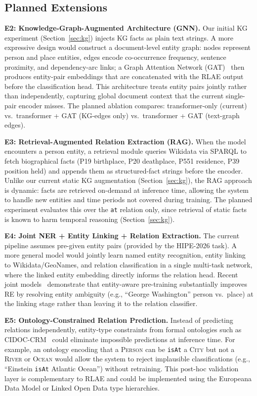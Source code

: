 \documentclass[11pt,a4paper]{article}
\begin{document}
\subsection*{Planned Extensions}

\textbf{E2: Knowledge-Graph-Augmented Architecture (GNN).} Our initial KG experiment (Section~\ref{sec:kg}) injects KG facts as plain text strings. A more expressive design would construct a document-level entity graph: nodes represent person and place entities, edges encode co-occurrence frequency, sentence proximity, and dependency-arc links; a Graph Attention Network (GAT)~\cite{velickovic2018} then produces entity-pair embeddings that are concatenated with the RLAE output before the classification head. This architecture treats entity pairs jointly rather than independently, capturing global document context that the current single-pair encoder misses. The planned ablation compares: transformer-only (current) vs.\ transformer + GAT (KG-edges only) vs.\ transformer + GAT (text-graph edges).

\textbf{E3: Retrieval-Augmented Relation Extraction (RAG).} When the model encounters a person entity, a retrieval module queries Wikidata via SPARQL to fetch biographical facts (P19 birthplace, P20 deathplace, P551 residence, P39 position held) and appends them as structured-fact strings before the encoder. Unlike our current static KG augmentation (Section~\ref{sec:kg}), the RAG approach is dynamic: facts are retrieved on-demand at inference time, allowing the system to handle new entities and time periods not covered during training. The planned experiment evaluates this over the \texttt{at} relation only, since retrieval of static facts is known to harm temporal reasoning (Section~\ref{sec:kg}).

\textbf{E4: Joint NER + Entity Linking + Relation Extraction.} The current pipeline assumes pre-given entity pairs (provided by the HIPE-2026 task). A more general model would jointly learn named entity recognition, entity linking to Wikidata/GeoNames, and relation classification in a single multi-task network, where the linked entity embedding directly informs the relation head. Recent joint models~\cite{yamada2020} demonstrate that entity-aware pre-training substantially improves RE by resolving entity ambiguity (e.g., ``George Washington'' person vs.\ place) at the linking stage rather than leaving it to the relation classifier.

\textbf{E5: Ontology-Constrained Relation Prediction.} Instead of predicting relations independently, entity-type constraints from formal ontologies such as CIDOC-CRM~\cite{doerr2003} could eliminate impossible predictions at inference time. For example, an ontology encoding that a \textsc{Person} can be \texttt{isAt} a \textsc{City} but not a \textsc{River} or \textsc{Ocean} would allow the system to reject implausible classifications (e.g., ``Einstein \texttt{isAt} Atlantic Ocean'') without retraining. This post-hoc validation layer is complementary to RLAE and could be implemented using the Europeana Data Model or Linked Open Data type hierarchies.
\end{document}
